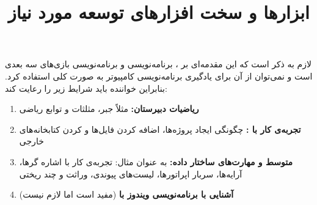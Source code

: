{
    \Large
    لازم به ذکر است که این مقدمه‌ای بر ، برنامه‌نویسی  و برنامه‌نویسی بازی‌های سه بعدی است و نمی‌توان از آن برای یادگیری برنامه‌نویسی کامپیوتر به صورت کلی استفاده کرد. بنابراین خواننده باید شرایط زیر را رعایت کند:
    \begin{enumerate}
        \item {\textbf{ریاضیات دبیرستان: } مثلاً جبر، مثلثات و توابع ریاضی}
        \item {\textbf{تجربه‌ی کار با :} چگونگی ایجاد پروژه‌ها، اضافه کردن فایل‌ها و  کردن کتابخانه‌های خارجی}
        \item {\textbf{ متوسط و مهارت‌های ساختار داده:} به عنوان مثال: تجربه‌ی کار با اشاره گر‌ها، آرایه‌ها، سربار اپراتور‌ها، لیست‌های پیوندی، وراثت و چند ریختی}
        \item {\textbf{آشنایی با برنامه‌نویسی ویندوز با } (مفید است اما لازم نیست)}
    \end{enumerate}
}
\textbf{\vspace{10pt}}

\title{
    \huge
    \hspace{-40pt}
    \textbf{ابزارها و سخت افزارهای توسعه مورد نیاز}
}  \rullFillWithLine[0.5em]{1pt}
\textbf{\vspace{7pt}}

